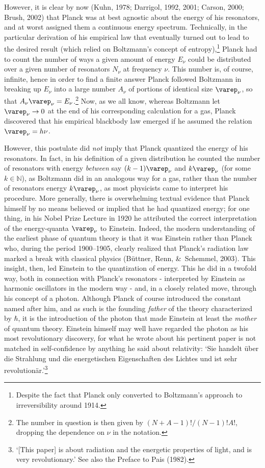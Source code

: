 \documentclass[12pt]{article}
\newcommand{\raw}{\rightarrow} \newcommand{\rat}{\mapsto}
\begin{document}
However, it is clear by now (Kuhn, 1978; Darrigol, 1992, 2001; Carson, 2000; Brush, 2002) that Planck was at best agnostic about the energy of his resonators, and at worst assigned them a continuous energy spectrum. Technically, in the particular derivation of his empirical law that eventually turned out to lead to the desired result (which relied on Boltzmann's concept of entropy),\footnote{Despite the fact that Planck only converted to Boltzmann's approach to irreversibility around 1914.} Planck had to count the number of ways a given amount of energy $E_{\nu}$ could be distributed over a given number of resonators $N_{\nu}$ at frequency $\nu$. This number is, of course, infinite, hence in order to find a finite answer Planck followed Boltzmann in breaking up $E_{\nu}$ into a large number $A_{\nu}$ of portions of identical size $\varep_{\nu}$, so that $A_{\nu}\varep_{\nu}=E_{\nu}$.\footnote{The number in question is then given by $(N+A-1)!/(N-1)!A!$, dropping the dependence on $\nu$ in the notation.}  Now, as we all know, whereas Boltzmann let
$\varep_{\nu}\raw 0$ at the end of his corresponding calculation for a gas, Planck discovered that his empirical blackbody law emerged if he assumed the relation $\varep_{\nu}=h\nu$.

 However, this postulate did \textit{not} imply that Planck quantized the energy of his resonators. In fact, in his definition of a given distribution he counted the number of resonators with energy \textit{between} say $(k-1)\varep_{\nu}$ and
$k\varep_{\nu}$ (for some $k\in\mathbb{N}$), as Boltzmann did in an analogous way for a gas, rather than the number of resonators  energy $k\varep_{\nu}$, as most physicists came to interpret his procedure. More generally, there is overwhelming textual evidence that Planck himself by no means believed or implied that he had quantized energy; for one thing, in his Nobel Prize Lecture in 1920 he attributed the correct interpretation of the energy-quanta $\varep_{\nu}$ to Einstein. 
Indeed, the modern understanding of the earliest phase of quantum theory is that it was Einstein rather than Planck who, during the period 1900--1905, clearly realized that Planck's radiation law marked a break with classical physics  (B\"{u}ttner, Renn,  \&\ Schemmel, 2003). This insight, then,  led Einstein to  the quantization of energy. This he did in a  twofold way,  both in connection with Planck's resonators - interpreted by Einstein as harmonic oscillators in the modern way - and, in a closely related move, through his concept of a photon.  Although Planck of course introduced the constant named after him, and as such is the founding {\it father} of the theory  characterized by $\hbar$, it is the introduction of the photon that  made Einstein at least the {\it mother} of quantum theory. Einstein himself may well  have regarded the photon as his
  most revolutionary discovery, for what he wrote about his  pertinent paper is not matched in self-confidence by anything he said about relativity:  
 `Sie handelt \"{u}ber die Strahlung und die energetischen Eigenschaften des Lichtes und ist sehr revolution\"{a}r.'\footnote{`[This paper] is about radiation and the energetic properties of light, and is very revolutionary.'  See also the Preface to Pais (1982).} 
\end{document}
